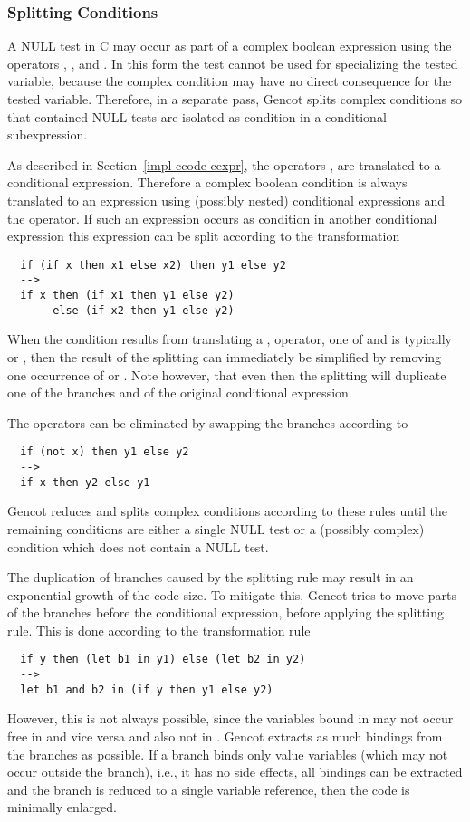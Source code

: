 \subsubsection{Splitting Conditions}

A NULL test in C may occur as part of a complex boolean expression using the operators \code{\&\&}, \code{||}, and \code{!}. In this form
the test cannot be used for specializing the tested variable, because the complex condition may have no direct consequence for the tested
variable. Therefore, in a separate pass, Gencot splits complex conditions so that contained NULL tests are isolated as condition in a
conditional subexpression.

As described in Section~\ref{impl-ccode-cexpr}, the operators \code{\&\&}, \code{||} are translated to a conditional expression. Therefore
a complex boolean condition is always translated to an expression using (possibly nested) conditional expressions and the  operator.
If such an expression occurs as condition in another conditional expression this expression can be split according to the transformation
\begin{verbatim}
  if (if x then x1 else x2) then y1 else y2
  -->
  if x then (if x1 then y1 else y2)
       else (if x2 then y1 else y2)
\end{verbatim}
When the condition results from translating a \code{\&\&}, \code{||} operator, one of  and  is typically 
or , then the result of the splitting can immediately be simplified by removing one occurrence of  or .
Note however, that even then the splitting will duplicate one of the branches  and  of the original conditional expression.

The  operators can be eliminated by swapping the branches according to
\begin{verbatim}
  if (not x) then y1 else y2
  -->
  if x then y2 else y1
\end{verbatim}

Gencot reduces and splits complex conditions according to these rules until the remaining conditions are either a single NULL test
or a (possibly complex) condition which does not contain a NULL test.

The duplication of branches caused by the splitting rule may result in an exponential growth of the code size. To mitigate this, Gencot
tries to move parts of the branches before the conditional expression, before applying the splitting rule. This is done according to the
transformation rule
\begin{verbatim}
  if y then (let b1 in y1) else (let b2 in y2)
  -->
  let b1 and b2 in (if y then y1 else y2)
\end{verbatim}
However, this is not always possible, since the variables bound in  may not occur free in  and vice versa and
also not in . Gencot extracts as much bindings from the branches as possible. If a branch binds only value variables (which may
not occur outside the branch), i.e., it has no side effects, all bindings can be extracted and the branch is reduced to a single variable
reference, then the code is minimally enlarged.

